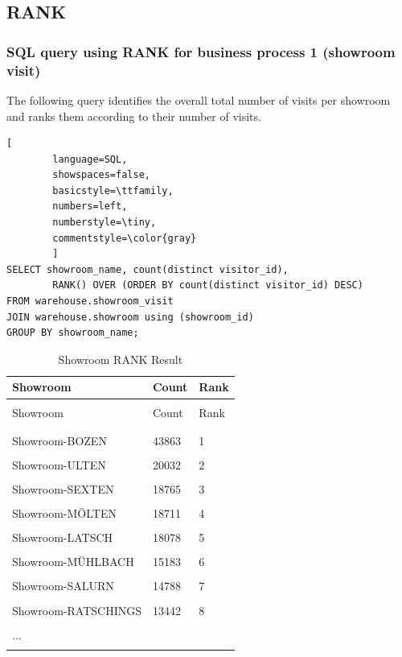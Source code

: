 \documentclass[letterpaper,12pt]{article}
\begin{document}
\subsection{RANK}

\subsubsection{SQL query using RANK for business process 1 (showroom visit)}

The following query identifies the overall total number of visits per showroom and ranks them according to their number of visits.

\begin{lstlisting}[
        language=SQL,
        showspaces=false,
        basicstyle=\ttfamily,
        numbers=left,
        numberstyle=\tiny,
        commentstyle=\color{gray}
        ]
SELECT showroom_name, count(distinct visitor_id), 
        RANK() OVER (ORDER BY count(distinct visitor_id) DESC)
FROM warehouse.showroom_visit
JOIN warehouse.showroom using (showroom_id)
GROUP BY showroom_name;
\end{lstlisting}

\begingroup
\renewcommand\arraystretch{0.5}
\begin{longtable}{p{4cm}p{4cm}p{3cm}}
        \caption{Showroom RANK Result} \\
	Showroom & Count & Rank \\
        \endfirsthead \\
        Showroom & Count & Rank \\
        \endhead \\
	\hline \\
        Showroom-BOZEN & 43863 & 1 \\
        \hline \\
        Showroom-ULTEN & 20032 & 2 \\
        \hline \\
        Showroom-SEXTEN & 18765 & 3 \\ 
        \hline \\
        Showroom-MÖLTEN & 18711 & 4 \\
        \hline \\
        Showroom-LATSCH & 18078 & 5 \\
        \hline \\
        Showroom-MÜHLBACH & 15183 & 6 \\ 
        \hline \\
        Showroom-SALURN & 14788 & 7 \\
        \hline \\
        Showroom-RATSCHINGS & 13442 & 8 \\ 
        \hline \\
        ... & & \\
        \hline \\
\end{longtable} 
\endgroup
\end{document}
